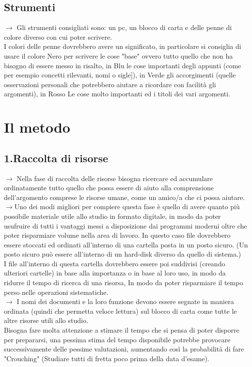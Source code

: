 \documentclass[11pt,a4paper]{article}
\begin{document}
\subsection{Strumenti}
$\rightarrow$ Gli strumenti consigliati sono: un pc, un blocco di carta e delle penne di colore diverso con cui poter scrivere.\\
 I colori delle penne dovrebbero avere un significato, in particolare si consiglia di usare il colore Nero per scrivere le cose "base" ovvero tutto quello che non ha bisogno di essere messo in risalto, in Blu le cose importanti degli appunti (come per esempio concetti rilevanti, nomi o sigle]), in Verde gli accorgimenti (quelle osservazioni personali che potrebbero aiutare a ricordare con facilità gli argomenti), in Rosso Le cose molto importanti ed i titoli dei vari argomenti.\\
\newline

\section{Il metodo}
\subsection{1.Raccolta di risorse}
$\rightarrow$ Nella fase di raccolta delle risorse bisogna ricercare ed accumulare ordinatamente tutto quello che possa essere di aiuto alla comprensione dell'argomento comprese le risorse umane, come un amico/a che ci possa aiutare.\\
$\rightarrow$Uno dei modi migliori per compiere questa fase è quello di avere quanto più possibile materiale utile allo studio in formato digitale, in modo da poter usufruire di tutti i vantaggi messi a disposizione dai programmi moderni oltre che poter risparmiare volume nella area di lavoro. In questo caso file dovrebbero essere stoccati ed ordinati all'interno di una cartella posta in un posto sicuro. (Un posto sicuro può essere all'interno di un hard-disk diverso da quello di sistema.)\\
I file all'interno di questa cartella dovrebbero essere poi suddivisi (creando ulteriori cartelle) in base alla importanza o in base al loro uso, in modo da ridurre il tempo di ricerca di una risorsa, In modo da poter risparmiare il tempo perso nelle operazioni sistematiche.\\ 
$\rightarrow$ I nomi dei documenti e la loro funzione devono essere segnate in maniera ordinata (quindi che permetta veloce lettura) sul blocco di carta come tutte le altre risorse utili allo studio.\\
 Bisogna fare molta attenzione a stimare il tempo che si pensa di poter disporre per prepararsi, una pessima stima del tempo disponibile potrebbe provocare successivamente delle pessime valutazioni, aumentando così la probabilità di fare "Crouching" (Studiare tutti di fretta poco prima della data d'esame).\\
\end{document}
